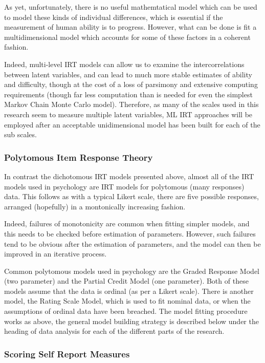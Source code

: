 As yet, unfortunately, there is no useful mathemtatical model \cite{borsboom2009end} which can be used to model these kinds of individual differences, which is essential if the measurement of human ability is to progress. However, what can be done is fit a multidimensional model which accounts for some of these factors in a coherent  fashion\cite{doran2007estimating}. 

Indeed, multi-level IRT models can allow us to examine the intercorrelations between latent variables, and can lead to much more stable estimates of ability and difficulty, though at the cost of a loss of parsimony and extensive computing requirements (though far less computation than is needed for even the simplest Markov Chain Monte Carlo model). Therefore, as many of the scales used in this research seem to measure multiple latent variables, ML IRT approaches will be employed after an acceptable  unidimensional model has been built for each of the sub scales. 

\subsubsection{Polytomous Item Response Theory}

In contrast the dichotomous IRT models presented above, almost all of the IRT models used in psychology are IRT models for polytomous (many responses) data. This follows as with a typical Likert scale, there are five possible responses, arranged (hopefully) in a montonically increasing fashion. 

Indeed, failures of monotonicity are common when fitting simpler models, and this needs to be checked before estimation of parameters. However, such failures tend to be obvious after the estimation of parameters, and the model can then be improved in an iterative process. 

Common polytomous models used in psychology are the Graded Response Model \cite{van1997handbook} (two parameter) and the Partial Credit Model (one parameter)\cite{fischer1995rasch}. Both of these models assume that the data is ordinal (as per a Likert scale). There is another model, the Rating Scale Model, which is used to fit nominal data, or when the assumptions of ordinal data have been breached. The model fitting procedure works as above, the general model building strategy is described below under the heading of data analysis for each of the different parts of the research.  

\subsubsection{Scoring Self Report Measures}

